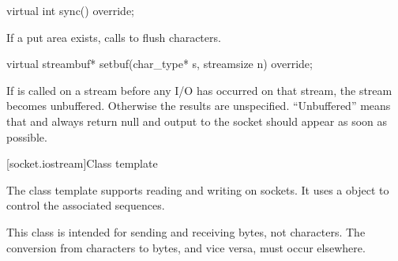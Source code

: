 \begin{itemdecl}
virtual int sync() override;
\end{itemdecl}

\begin{itemdescr}
\pnum
\effects If a put area exists, calls  to flush characters.
\end{itemdescr}

\begin{itemdecl}
virtual streambuf* setbuf(char_type* s, streamsize n) override;
\end{itemdecl}

\begin{itemdescr}
\pnum
\effects If  is called on a stream before any I/O has occurred on that stream, the stream becomes unbuffered. Otherwise the results are unspecified. ``Unbuffered'' means that  and  always return null and output to the socket should appear as soon as possible.
\end{itemdescr}




[socket.iostream]{Class template }

\pnum
The class template  supports reading and writing on sockets. It uses a  object to control the associated sequences.

\pnum
 \begin{note} This class is intended for sending and receiving bytes, not characters. The conversion from characters to bytes, and vice versa, must occur elsewhere. \end{note}

